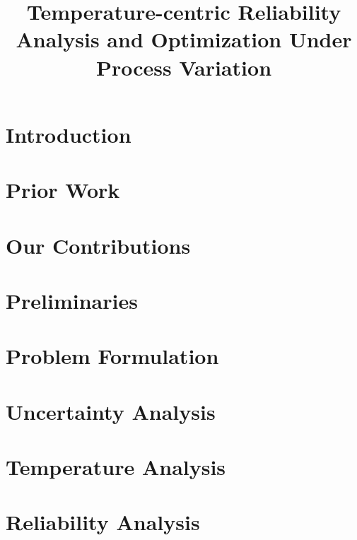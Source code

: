 \documentclass[conference]{IEEEtran}
\title{Temperature-centric Reliability Analysis and Optimization Under Process Variation}
\author{}
\begin{document}
  \maketitle

  \begin{abstract}
    
  \end{abstract}


  \section{Introduction} 
  

  \section{Prior Work} 
  

  \section{Our Contributions} 
  

  \section{Preliminaries} 
  

  \section{Problem Formulation} 
  

  \section{Uncertainty Analysis} 
  

  \section{Temperature Analysis} 
  

  \section{Reliability Analysis} 
  
\end{document}

